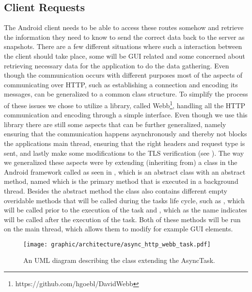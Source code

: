 \subsection{Client Requests}
\label{sub:client_requests}
The Android client needs to be able to access these routes somehow and retrieve the information they need to know to send the correct data back to the server as snapshots. There are a few different situations where such a interaction between the client should take place, some will be GUI related and some concerned about retrieving necessary data for the application to do the data gathering. Even though the communication occurs with different purposes most of the aspects of communicating over HTTP, such as establishing a connection and encoding its messages, can be generalized to a common class structure. To simplify the process of these issues we chose to utilize a library, called Webb\footnote{https://github.com/hgoebl/DavidWebb}, handling all the HTTP communication and encoding through a simple interface. Even though we use this library there are still some aspects that can be further generalized, namely ensuring that the communication happens asynchronously and thereby not blocks the applications main thread, ensuring that the right headers and request type is sent, and lastly make some modifications to the TLS verification (see ). The way we generalized these aspects were by extending (inheriting from) a class in the Android framework called  as seen in , which is an abstract class with an abstract method, named  which is the primary method that is executed in a background thread. Besides the abstract method the class also contains different empty overidable methods that will be called during the tasks life cycle, such as , which will be called prior to the execution of the task and , which as the name indicates will be called after the execution of the task. Both of these methods will be run on the main thread, which allows them to modify for example GUI elements. 

\begin{figure}[!htbp]
    \centering
    \texttt{[image: graphic/architecture/async\_http\_webb\_task.pdf]}
    \caption{An UML diagram describing the class extending the AsyncTask.}
    \label{fig:async_http_webb_task}
\end{figure}
\FloatBarrier

